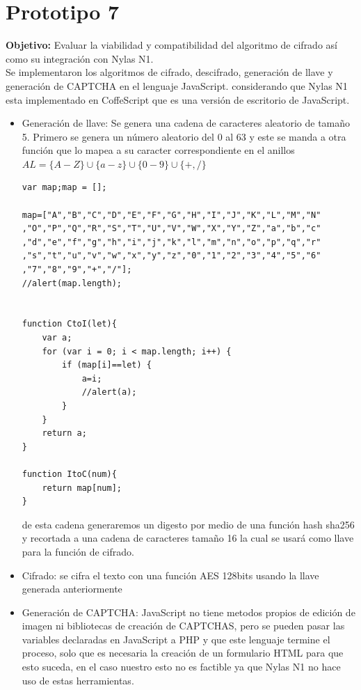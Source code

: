\documentclass[12pt,oneside,onecolumn,openany]{report}
\begin{document}
\section{Prototipo 7}
\textbf{Objetivo:} Evaluar la viabilidad y compatibilidad del algoritmo de cifrado así como su integración con Nylas N1.\\
Se implementaron los algoritmos de cifrado, descifrado, generación de llave y generación de CAPTCHA en el lenguaje JavaScript. considerando que Nylas N1 esta implementado en CoffeScript que es una versión de escritorio de JavaScript.
\begin{itemize}
 \item Generación de llave: Se genera una cadena de caracteres aleatorio de tamaño 5. Primero se genera un número aleatorio del 0 al 63 y este se manda a otra función que lo mapea a su caracter correspondiente en el anillos $AL=\{A-Z\}\cup \{a-z\}\cup \{0-9\}\cup \{+,/\}$ 
 \begin{lstlisting}[frame=single]
  var map;map = [];
  
map=["A","B","C","D","E","F","G","H","I","J","K","L","M","N"
,"O","P","Q","R","S","T","U","V","W","X","Y","Z","a","b","c"
,"d","e","f","g","h","i","j","k","l","m","n","o","p","q","r"
,"s","t","u","v","w","x","y","z","0","1","2","3","4","5","6"
,"7","8","9","+","/"];
//alert(map.length);


function CtoI(let){
	var a;
	for (var i = 0; i < map.length; i++) {
		if (map[i]==let) {
			a=i;
			//alert(a);
		}
	}
	return a;
}

function ItoC(num){
	return map[num];
}
 \end{lstlisting}
 de esta cadena generaremos un digesto por medio de una función hash sha256 y recortada a una cadena de caracteres tamaño 16 la cual se usará como llave para la función de cifrado.
\item Cifrado: se cifra el texto con una función AES 128bits usando la llave generada anteriormente
\item Generación de CAPTCHA: JavaScript no tiene metodos propios de edición de imagen ni bibliotecas de creación de CAPTCHAS, pero se pueden pasar las variables declaradas en JavaScript a PHP y que este lenguaje termine el proceso, solo que es necesaria la creación de un formulario HTML para que esto suceda, en el caso nuestro esto no es factible ya que Nylas N1 no hace uso de estas herramientas.
\end{itemize}
\end{document}
